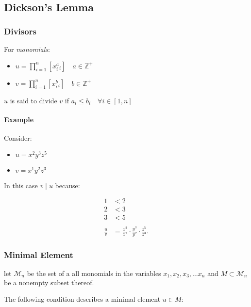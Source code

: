 \documentclass[a4paper,11pt,twoside]{article}
\begin{document}
\subsection{Dickson's Lemma}
\label{sec:org71762fc}
\subsubsection{Divisors}
\label{sec:org2b3dd0c}
For \emph{monomials}:

\begin{itemize}
\item \(u= \prod^n_{i=1}\left[ x_i^a_i \right] \quad a \in \mathbb{Z^+}\)
\item \(v= \prod^n_{i=1}\left[ x_i^b_i \right] \quad b \in \mathbb{Z^+}\)
\end{itemize}

\(u\) is said to divide \(v\) if \(a_i \leq b_i \quad \forall i \in \left[ 1, n \right]\)

\paragraph{Example}
\label{sec:org85e8673}

Consider:

\begin{itemize}
\item \(u = x^2y^3z^5\)
\item \(v = x^1y^2z^3\)
\end{itemize}

In this case \(v \mid u\) because:

\begin{align*}
      1 &< 2 \\
      2 &< 3 \\
      3 &< 5 \\
      \ \\
      \frac{u}{v} &= \frac{x^2}{x^1} \cdot \frac{y^3}{y^2} \cdot  \frac{z^5}{z^3}
.\end{align*}

\subsubsection{Minimal Element}
\label{sec:org5f6d987}

let \(\mathcal{M}_n\) be the set of a all monomials in the variables
\(x_1, x_2, x_3, \ldots x_n\) and \(M \subset \mathcal{M}_n\) be a
nonempty subset thereof.

The following condition describes a minimal element \(u\in M\):
\end{document}
